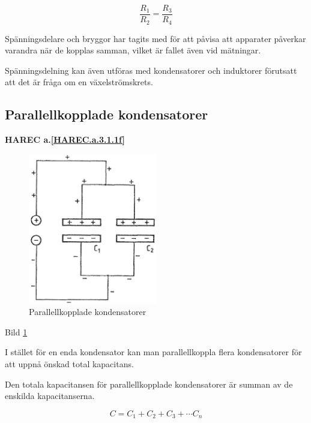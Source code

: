 \[\frac{R_1}{R_2} = \frac{R_3}{R_4}\]

Spänningsdelare och bryggor har tagits med för att påvisa att apparater påverkar
varandra när de kopplas samman, vilket är fallet även vid mätningar.

Spänningsdelning kan även utföras med kondensatorer och induktorer förutsatt att
det är fråga om en växelströmskrets.

\subsection{Parallellkopplade kondensatorer}
\textbf{HAREC a.\ref{HAREC.a.3.1.1f}\label{myHAREC.a.3.1.1f}}

\begin{figure}[h]
\begin{center}
  \includegraphics[width=0.5\textwidth]{images/cropped_pdfs/bild_2_3-05.pdf}
  \caption{Parallellkopplade kondensatorer}
  \label{fig:BildII3-05}
\end{center}
\end{figure}

Bild \ref{fig:BildII3-05}

I stället för en enda kondensator kan man parallellkoppla flera kondensatorer
för att uppnå önskad total kapacitans.

Den totala kapacitansen för parallellkopplade kondensatorer är summan av de
enskilda kapacitanserna.

\[C = C_1 + C_2 + C_3 + \cdots C_n\]

